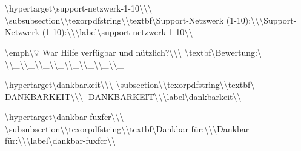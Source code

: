 \textbackslash{}hypertarget\textbackslash{}{support-netzwerk-1-10\textbackslash{}}\textbackslash{}{\textbackslash{}%
\textbackslash{}subsubsection\textbackslash{}{\textbackslash{}texorpdfstring\textbackslash{}{\textbackslash{}textbf\textbackslash{}{Support-Netzwerk (1-10):\textbackslash{}}\textbackslash{}}\textbackslash{}{Support-Netzwerk (1-10):\textbackslash{}}\textbackslash{}}\textbackslash{}label\textbackslash{}{support-netzwerk-1-10\textbackslash{}}\textbackslash{}}

\textbackslash{}emph\textbackslash{}{💡 War Hilfe verfügbar und nützlich?\textbackslash{}}\textbackslash{}\textbackslash{}
\textbackslash{}textbf\textbackslash{}{Bewertung:\textbackslash{}} \textbackslash{}\textbackslash{}_\textbackslash{}\textbackslash{}_\textbackslash{}\textbackslash{}_\textbackslash{}\textbackslash{}_\textbackslash{}\textbackslash{}_\textbackslash{}\textbackslash{}_\textbackslash{}\textbackslash{}_\textbackslash{}\textbackslash{}_

\textbackslash{}hypertarget\textbackslash{}{dankbarkeit\textbackslash{}}\textbackslash{}{\textbackslash{}%
\textbackslash{}subsection\textbackslash{}{\textbackslash{}texorpdfstring\textbackslash{}{\textbackslash{}textbf\textbackslash{}{💝 DANKBARKEIT\textbackslash{}}\textbackslash{}}\textbackslash{}{💝 DANKBARKEIT\textbackslash{}}\textbackslash{}}\textbackslash{}label\textbackslash{}{dankbarkeit\textbackslash{}}\textbackslash{}}

\textbackslash{}hypertarget\textbackslash{}{dankbar-fuxfcr\textbackslash{}}\textbackslash{}{\textbackslash{}%
\textbackslash{}subsubsection\textbackslash{}{\textbackslash{}texorpdfstring\textbackslash{}{\textbackslash{}textbf\textbackslash{}{Dankbar für:\textbackslash{}}\textbackslash{}}\textbackslash{}{Dankbar für:\textbackslash{}}\textbackslash{}}\textbackslash{}label\textbackslash{}{dankbar-fuxfcr\textbackslash{}}\textbackslash{}}

